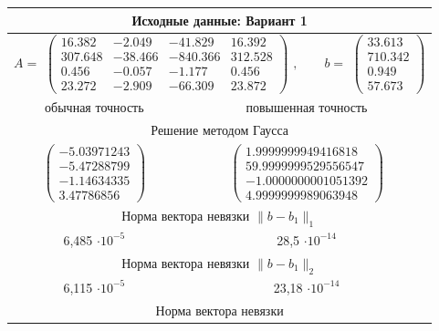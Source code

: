 \documentclass[12pt, a4paper]{article}
\begin{document}
\footnotesize
\begin{center}
	\begin{tabular}{|c|c|}\hline
		\multicolumn{2}{|c|}{Исходные данные: Вариант 1}\\
		\hline \multicolumn{2}{|c|}{$A = $
			$
			\begin{pmatrix}
				16.382 &  -2.049 & -41.829 & 16.392 \\ 
				307.648 & -38.466 & -840.366 & 312.528 \\ 
				0.456 & -0.057 & -1.177 & 0.456 \\ 
				23.272 & -2.909 & -66.309 & 23.872 
			\end{pmatrix}
			$
			$,\qquad b = $
			$
			\begin{pmatrix}
				33.613 \\ 
				710.342 \\ 
				0.949 \\ 
				57.673 
			\end{pmatrix}
			$
		} \\
		\hline
		обычная точность & повышенная точность \\
		\hline
		\multicolumn{2}{|c|}{Решение методом Гаусса} \\
		\hline
		$
		\begin{pmatrix}
			-5.03971243 \\ 
			-5.47288799 \\ 
			-1.14634335 \\ 
			3.47786856 
		\end{pmatrix}
		$
		& 
		$
		\begin{pmatrix}
			1.9999999949416818 \\ 
			59.9999999529556547 \\ 
			-1.0000000001051392 \\ 
			4.9999999989063948 
		\end{pmatrix}
		$
		\\
		\hline \multicolumn{2}{|c|}{Норма вектора невязки $\|b - b_1 \|_1$}\\
		\hline
		6,485 $\cdot 10^{-5}$ & 28,5 $\cdot 10^{-14}$\\
		\hline \multicolumn{2}{|c|}{Норма вектора невязки $\|b - b_1 \|_2$}\\
		\hline
		6,115 $\cdot 10^{-5}$ & 23,18 $\cdot 10^{-14}$\\
		\hline \multicolumn{2}{|c|}{Норма вектора невязки 
			
}
\end{tabular}
\end{center}
\end{document}
